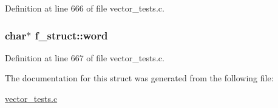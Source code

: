 \-Definition at line 666 of file vector\-\_\-tests.\-c.

\hypertarget{structf__struct_aa8f65f08c5e6180da916f9001438eab5}{
\subsubsection[{word}]{\setlength{\rightskip}{0pt plus 5cm}char$\ast$ {\bf f\-\_\-struct\-::word}}}\label{structf__struct_aa8f65f08c5e6180da916f9001438eab5}


\-Definition at line 667 of file vector\-\_\-tests.\-c.



\-The documentation for this struct was generated from the following file\-:\begin{DoxyCompactItemize}
\item 
\hyperlink{vector__tests_8c}{vector\-\_\-tests.\-c}\end{DoxyCompactItemize}
